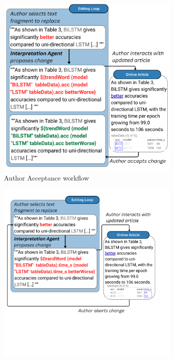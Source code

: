\begin{figure}[ht]
    \centering
    \begin{subfigure}{0.50\linewidth}
        \centering
        \includegraphics[width=\linewidth]{fig/data-flow-correct}
        \caption{Author Acceptance workflow}
        \label{fig:data-flow-correct}
    \end{subfigure}\hfill
    \begin{subfigure}{0.50\linewidth}
        \centering
        \includegraphics[width=\linewidth]{fig/data-flow-error}

\end{subfigure}
\end{figure}
